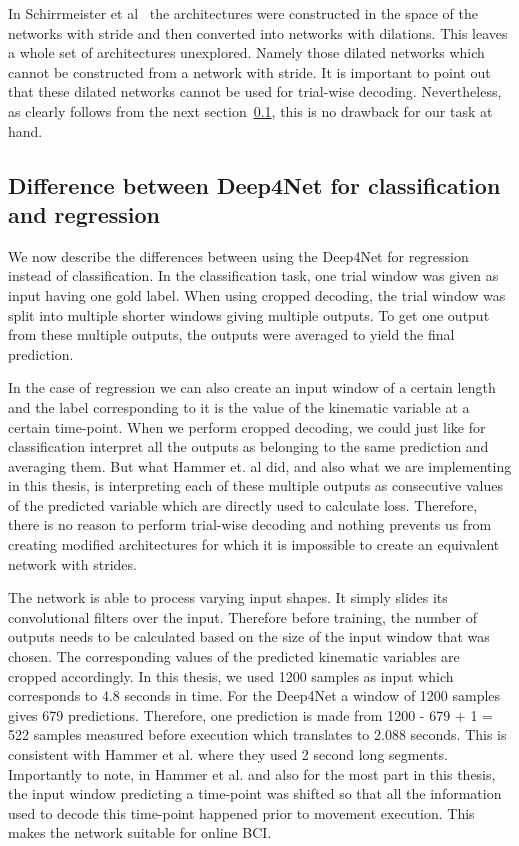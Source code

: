 In Schirrmeister et al~\cite{schirrmeister-deep-2017} the architectures were constructed in the space of the networks with stride and then converted into networks with dilations.
This leaves a whole set of architectures unexplored.
Namely those dilated networks which cannot be constructed from a network with stride.
It is important to point out that these dilated networks cannot be used for trial-wise decoding.
Nevertheless, as clearly follows from the next section~\ref{subsec:difference-between-deep4net-for-classification-and-regression}, this is no drawback for our task at hand.

\subsection{Difference between Deep4Net for classification and regression}\label{subsec:difference-between-deep4net-for-classification-and-regression}
We now describe the differences between using the Deep4Net for regression instead of classification.
In the classification task, one trial window was given as input having one gold label.
When using cropped decoding, the trial window was split into multiple shorter windows giving multiple outputs.
To get one output from these multiple outputs, the outputs were averaged to yield the final prediction.

In the case of regression we can also create an input window of a certain length and the label corresponding to it is the value of the kinematic variable at a certain time-point.
When we perform cropped decoding, we could just like for classification interpret all the outputs as belonging to the same prediction and averaging them.
But what Hammer et. al did, and also what we are implementing in this thesis, is interpreting each of these multiple outputs as consecutive values of the predicted variable which are directly used to calculate loss.
Therefore, there is no reason to perform trial-wise decoding and nothing prevents us from creating modified architectures for which it is impossible to create an equivalent network with strides.

The network is able to process varying input shapes.
It simply slides its convolutional filters over the input.
Therefore before training, the number of outputs needs to be calculated based on the size of the input window that was chosen.
The corresponding values of the predicted kinematic variables are cropped accordingly.
In this thesis, we used 1200 samples as input which corresponds to 4.8 seconds in time.
For the Deep4Net a window of 1200 samples gives 679 predictions.
Therefore, one prediction is made from 1200 - 679 + 1 = 522 samples measured before execution which translates to 2.088 seconds.
This is consistent with Hammer et al. where they used 2 second long segments.
Importantly to note, in Hammer et al. and also for the most part in this thesis, the input window predicting a time-point was shifted so that all the information used to decode this time-point happened prior to movement execution.
This makes the network suitable for online BCI.


